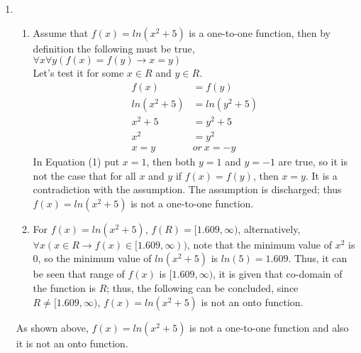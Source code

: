 \documentclass[12pt]{article}
\begin{document}
\renewcommand{\theenumi}{\alph{enumi}}
\renewcommand{\theenumii}{\roman{enumii}}
\begin{enumerate}
\item
    \begin{enumerate}
        \item Assume that $f(x) = ln(x^2 + 5)$ is a one-to-one function, then by definition the following must be true,\\
        $\forall x \forall y (f(x) = f(y) \rightarrow x = y)$\\
        Let's test it for some $x \in R$ and $y \in R$.\\
        \begin{equation} 
        \label{eq1}
        \begin{split}
            f(x) & = f(y) \\
            ln(x^2 + 5) &= ln(y^2 + 5)\\
            x^2 + 5 &= y^2 + 5\\
            x^2 &= y^2\\
            x = y \ & or \ x = -y
        \end{split}
        \end{equation}
        In Equation (1) put $x = 1$, then both $y = 1$ and $y = -1$ are true, so it is not the case that for all $x$ and $y$ if $f(x) = f(y)$, then $x = y$. It is a contradiction with the assumption. The assumption is discharged; thus $f(x) = ln(x^2 + 5)$ is not a one-to-one function.

        \item For $f(x) = ln(x^2 + 5)$, $f(R) = [1.609, \infty)$, alternatively, $\forall x (x \in R \rightarrow f(x) \in [1.609, \infty))$, note that the minimum value of $x^2$ is $0$, so the minimum value of $ln(x^2 + 5)$ is $ln(5) = 1.609$. Thus, it can be seen that range of $f(x)$ is $[1.609, \infty)$, it is given that co-domain of the function is $R$; thus, the following can be concluded, since $R \neq [1.609, \infty)$, $f(x) = ln(x^2 + 5)$ is not an onto function.
    \end{enumerate}
    As shown above, $f(x) = ln(x^2 + 5)$ is not a one-to-one function and also it is not an onto function.
  

\end{enumerate}
\end{document}

